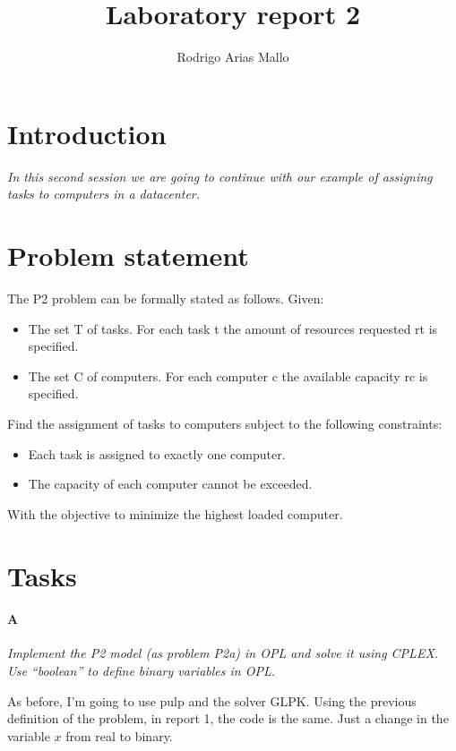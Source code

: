 \documentclass[11pt,a4paper]{article}
\title{Laboratory report 2}
\author{Rodrigo Arias Mallo}
\begin{document}
\maketitle

\section*{Introduction}
\textsl{In this second session we are going to continue with our example of 
assigning tasks to computers in a datacenter.}

\section*{Problem statement}
{\sl

The P2 problem can be formally stated as follows. Given:
\begin{itemize}
\item The set T of tasks. For each task t the amount of resources requested rt 
is specified.
\item The set C of computers. For each computer c the available capacity rc is 
specified.
\end{itemize}
%
Find the assignment of tasks to computers subject to the following constraints:
\begin{itemize}
\item Each task is assigned to exactly one computer.
\item The capacity of each computer cannot be exceeded.
\end{itemize}
%
With the objective to minimize the highest loaded computer. 

}%
%
\section*{Tasks}
\paragraph*{A}
{\sl Implement the P2 model (as problem P2a) in OPL and solve it using CPLEX.  
Use ``boolean'' to define binary variables in OPL.}

As before, I'm going to use pulp and the solver GLPK. Using the previous 
definition of the problem, in report 1, the code is the same. Just a change in 
the variable $x$ from real to binary.
\end{document}
